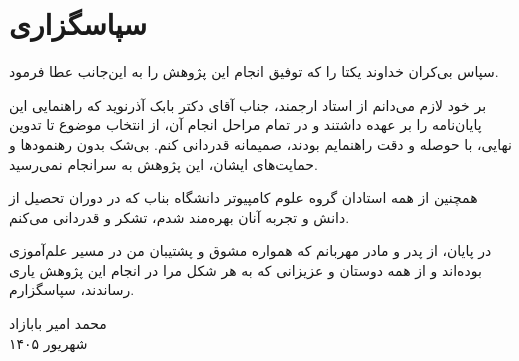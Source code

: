 \chapter*{سپاسگزاری}
{}

سپاس بی‌کران خداوند یکتا را که توفیق انجام این پژوهش را به این‌جانب عطا فرمود.

بر خود لازم می‌دانم از استاد ارجمند، جناب آقای دکتر بابک آذرنوید که راهنمایی این
پایان‌نامه را بر عهده داشتند و در تمام مراحل انجام آن، از انتخاب موضوع تا تدوین
نهایی، با حوصله و دقت راهنمایم بودند، صمیمانه قدردانی کنم. بی‌شک بدون رهنمودها
و حمایت‌های ایشان، این پژوهش به سرانجام نمی‌رسید.

همچنین از همه استادان گروه علوم کامپیوتر دانشگاه بناب که در دوران تحصیل از
دانش و تجربه آنان بهره‌مند شدم، تشکر و قدردانی می‌کنم.

در پایان، از پدر و مادر مهربانم که همواره مشوق و پشتیبان من در مسیر علم‌آموزی
بوده‌اند و از همه دوستان و عزیزانی که به هر شکل مرا در انجام این پژوهش یاری
رساندند، سپاسگزارم.

\begin{flushleft}
محمد امیر بابازاد\\
شهریور ۱۴۰۵
\end{flushleft}
